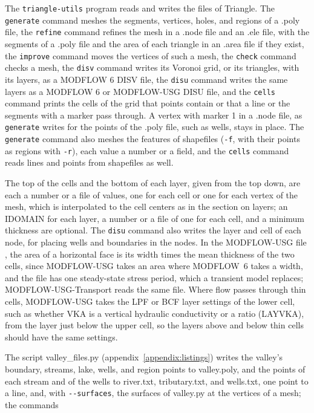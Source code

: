 \documentclass[11pt,twoside,twocolumn]{usgsreport}
\newcommand{\codelead}{\par\vskip 0pt plus 7\baselineskip\penalty -250\vskip 0pt plus -7\baselineskip}
\begin{document}
The \texttt{triangle-utils} program reads and writes the files of Triangle. The \texttt{generate} command meshes the segments, vertices, holes, and regions of a .poly file, the \texttt{refine} command refines the mesh in a .node file and an .ele file, with the segments of a .poly file and the area of each triangle in an .area file if they exist, the \texttt{improve} command moves the vertices of such a mesh, the \texttt{check} command checks a mesh, the \texttt{disv} command writes its Voronoi grid, or its triangles, with its layers, as a MODFLOW 6 DISV file, the \texttt{disu} command writes the same layers as a MODFLOW 6 or MODFLOW-USG DISU file, and the \texttt{cells} command prints the cells of the grid that points contain or that a line or the segments with a marker pass through. A vertex with marker 1 in a .node file, as \texttt{generate} writes for the points of the .poly file, such as wells, stays in place. The \texttt{generate} command also meshes the features of shapefiles (\texttt{-f}, with their points as regions with \texttt{-r}), each value a number or a field, and the \texttt{cells} command reads lines and points from shapefiles as well.

The top of the cells and the bottom of each layer, given from the top down, are each a number or a file of values, one for each cell or one for each vertex of the mesh, which is interpolated to the cell centers as in the section on layers; an IDOMAIN for each layer, a number or a file of one for each cell, and a minimum thickness are optional. The \texttt{disu} command also writes the layer and cell of each node, for placing wells and boundaries in the nodes. In the MODFLOW-USG file \citep{panday2013modflowusg}, the area of a horizontal face is its width times the mean thickness of the two cells, since MODFLOW-USG takes an area where MODFLOW~6 takes a width, and the file has one steady-state stress period, which a transient model replaces; MODFLOW-USG-Transport reads the same file. Where flow passes through thin cells, MODFLOW-USG takes the LPF or BCF layer settings of the lower cell, such as whether VKA is a vertical hydraulic conductivity or a ratio (LAYVKA), from the layer just below the upper cell, so the layers above and below thin cells should have the same settings.

\codelead
The script valley\_files.py (appendix~\ref{appendix:listings}) writes the valley's boundary, streams, lake, wells, and region points to valley.poly, and the points of each stream and of the wells to river.txt, tributary.txt, and wells.txt, one point to a line, and, with \texttt{-{}-surfaces}, the surfaces of valley.py at the vertices of a mesh; the commands
\end{document}
